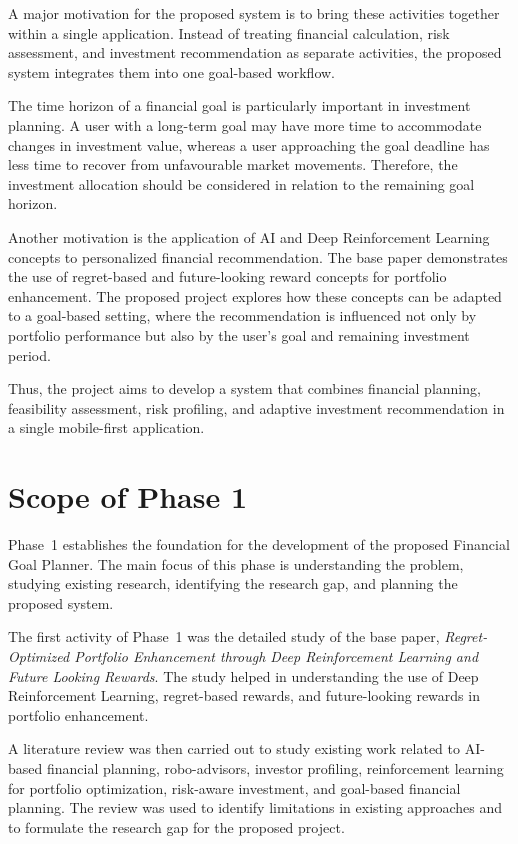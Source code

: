 A major motivation for the proposed system is to bring these activities together within a single application. Instead of treating financial calculation, risk assessment, and investment recommendation as separate activities, the proposed system integrates them into one goal-based workflow.

The time horizon of a financial goal is particularly important in investment planning. A user with a long-term goal may have more time to accommodate changes in investment value, whereas a user approaching the goal deadline has less time to recover from unfavourable market movements. Therefore, the investment allocation should be considered in relation to the remaining goal horizon.

Another motivation is the application of AI and Deep Reinforcement Learning concepts to personalized financial recommendation. The base paper demonstrates the use of regret-based and future-looking reward concepts for portfolio enhancement. The proposed project explores how these concepts can be adapted to a goal-based setting, where the recommendation is influenced not only by portfolio performance but also by the user's goal and remaining investment period.

Thus, the project aims to develop a system that combines financial planning, feasibility assessment, risk profiling, and adaptive investment recommendation in a single mobile-first application.

\section{Scope of Phase 1}
Phase~1 establishes the foundation for the development of the proposed Financial Goal Planner. The main focus of this phase is understanding the problem, studying existing research, identifying the research gap, and planning the proposed system.

The first activity of Phase~1 was the detailed study of the base paper, \emph{Regret-Optimized Portfolio Enhancement through Deep Reinforcement Learning and Future Looking Rewards}. The study helped in understanding the use of Deep Reinforcement Learning, regret-based rewards, and future-looking rewards in portfolio enhancement.

A literature review was then carried out to study existing work related to AI-based financial planning, robo-advisors, investor profiling, reinforcement learning for portfolio optimization, risk-aware investment, and goal-based financial planning. The review was used to identify limitations in existing approaches and to formulate the research gap for the proposed project.

